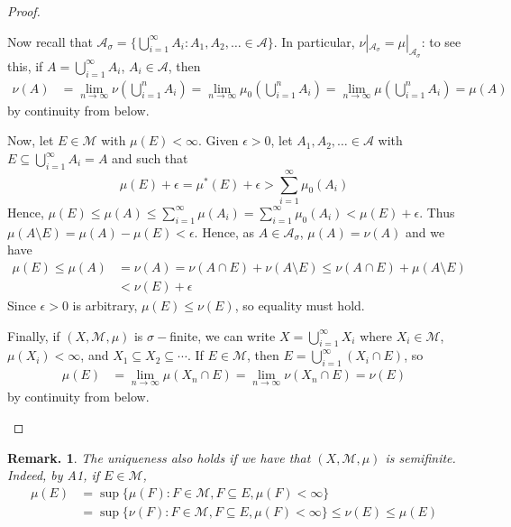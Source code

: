 \documentclass[11pt, a4paper]{memoir}
\theoremstyle{change}
\theoremstyle{plain}
\theoremstyle{nonumberplain}
\newtheorem{remark}{Remark.}
\newtheorem{proof}{Proof}
\numberwithin{equation}{section}
\begin{document}
\begin{proof}
\begin{enumerate}[r]
            Now recall that $\mathcal{A}_\sigma=\{\bigcup_{i=1}^\infty A_i:A_1,A_2,\ldots\in\mathcal{A}\}$.
            In particular, $\nu|_{\mathcal{A}_\sigma}=\mu|_{\mathcal{A}_\sigma}$: to see this, if $A=\bigcup_{i=1}^\infty A_i$, $A_i\in\mathcal{A}$, then
            \begin{align*}
                \nu(A) &= \lim_{n\to\infty} \nu\left(\bigcup_{i=1}^n A_i\right)= \lim_{n\to\infty} \mu_0\left(\bigcup_{i=1}^n A_i\right)= \lim_{n\to\infty}\mu\left(\bigcup_{i=1}^n A_i\right)=\mu(A)
            \end{align*}
            by continuity from below.

            Now, let $E\in\mathcal{M}$ with $\mu(E)<\infty$.
            Given $\epsilon>0$, let $A_1,A_2,\ldots\in\mathcal{A}$ with $E\subseteq\bigcup_{i=1}^\infty A_i=A$ and such that
            \begin{equation*}
                \mu(E)+\epsilon=\mu^*(E)+\epsilon>\sum\limits_{i=1}^\infty\mu_0(A_i)
            \end{equation*}
            Hence, $\mu(E)\leq\mu(A)\leq\sum_{i=1}^\infty \mu(A_i)=\sum_{i=1}^\infty \mu_0(A_i)<\mu(E)+\epsilon$.
            Thus $\mu(A\setminus E)=\mu(A)-\mu(E)<\epsilon$.
            Hence, as $A\in\mathcal{A}_\sigma$, $\mu(A)=\nu(A)$ and we have
            \begin{align*}
                \mu(E)\leq\mu(A) &= \nu(A)=\nu(A\cap E)+\nu(A\setminus E)\leq \nu(A\cap E)+\mu(A\setminus E)\\
                                 &< \nu(E)+\epsilon
            \end{align*}
            Since $\epsilon>0$ is arbitrary, $\mu(E)\leq\nu(E)$, so equality must hold.

            Finally, if $(X,\mathcal{M},\mu)$ is $\sigma-$finite, we can write $X=\bigcup_{i=1}^\infty X_i$ where $X_i\in\mathcal{M}$, $\mu(X_i)<\infty$, and $X_1\subseteq X_2\subseteq\cdots$.
            If $E\in\mathcal{M}$, then $E=\bigcup_{i=1}^\infty(X_i\cap E)$, so
            \begin{align*}
                \mu(E) &= \lim_{n\to\infty}\mu(X_n\cap E)= \lim_{n\to\infty}\nu(X_n\cap E)=\nu(E)
            \end{align*}
            by continuity from below.
    \end{enumerate}
\end{proof}
\begin{remark}
    The uniqueness also holds if we have that $(X,\mathcal{M},\mu)$ is semifinite.
    Indeed, by A1, if $E\in\mathcal{M}$,
    \begin{align*}
        \mu(E)&=\sup\{\mu(F):F\in\mathcal{M},F\subseteq E,\mu(F)<\infty\}\\
              &=\sup\{\nu(F):F\in\mathcal{M},F\subseteq E,\mu(F)<\infty\}\leq\nu(E)\leq\mu(E)
    \end{align*}
\end{remark}
\end{document}
